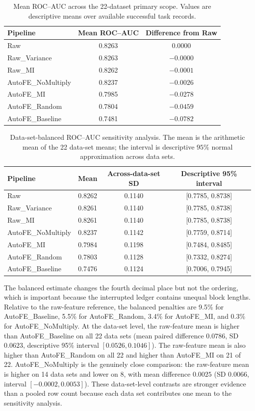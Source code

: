 \documentclass[preprint,12pt]{elsarticle}
\begin{document}
\begin{table}[t]
\centering
\caption{Mean ROC--AUC across the 22-dataset primary scope.  Values are descriptive means over available successful task records.}
\label{tab:roc}
\begin{tabular}{lcc}
\toprule
Pipeline & Mean ROC--AUC & Difference from Raw \\
\midrule
Raw & 0.8263 & 0.0000 \\
Raw\_Variance & 0.8263 & $-0.0000$ \\
Raw\_MI & 0.8262 & $-0.0001$ \\
AutoFE\_NoMultiply & 0.8237 & $-0.0026$ \\
AutoFE\_MI & 0.7985 & $-0.0278$ \\
AutoFE\_Random & 0.7804 & $-0.0459$ \\
AutoFE\_Baseline & 0.7481 & $-0.0782$ \\
\bottomrule
\end{tabular}
\end{table}

\begin{table}[t]
\centering
\caption{Data-set-balanced ROC--AUC sensitivity analysis.  The mean is the arithmetic mean of the 22 data-set means; the interval is descriptive $95\%$ normal approximation across data sets.}
\label{tab:balanced}
\begin{tabular}{lccc}
\toprule
Pipeline & Mean & Across-data-set SD & Descriptive 95\% interval \\
\midrule
Raw & 0.8262 & 0.1140 & [0.7785, 0.8738] \\
Raw\_Variance & 0.8261 & 0.1140 & [0.7785, 0.8738] \\
Raw\_MI & 0.8261 & 0.1140 & [0.7785, 0.8738] \\
AutoFE\_NoMultiply & 0.8237 & 0.1142 & [0.7759, 0.8714] \\
AutoFE\_MI & 0.7984 & 0.1198 & [0.7484, 0.8485] \\
AutoFE\_Random & 0.7803 & 0.1128 & [0.7332, 0.8274] \\
AutoFE\_Baseline & 0.7476 & 0.1124 & [0.7006, 0.7945] \\
\bottomrule
\end{tabular}
\end{table}

The balanced estimate changes the fourth decimal place but not the ordering, which is important because the interrupted ledger contains unequal block lengths.  Relative to the raw-feature reference, the balanced penalties are 9.5\% for AutoFE\_Baseline, 5.5\% for AutoFE\_Random, 3.4\% for AutoFE\_MI, and 0.3\% for AutoFE\_NoMultiply.  At the data-set level, the raw-feature mean is higher than AutoFE\_Baseline on all 22 data sets (mean paired difference $0.0786$, SD $0.0623$, descriptive 95\% interval $[0.0526,0.1046]$).  The raw-feature mean is also higher than AutoFE\_Random on all 22 and higher than AutoFE\_MI on 21 of 22.  AutoFE\_NoMultiply is the genuinely close comparison: the raw-feature mean is higher on 14 data sets and lower on 8, with mean difference $0.0025$ (SD $0.0066$, interval $[-0.0002,0.0053]$).  These data-set-level contrasts are stronger evidence than a pooled row count because each data set contributes one mean to the sensitivity analysis.
\end{document}
